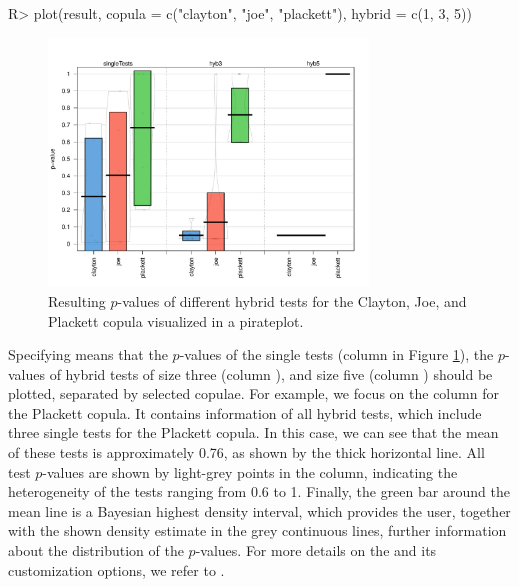 \begin{example}
R> plot(result, copula = c("clayton", "joe", "plackett"), hybrid = c(1, 3, 5))
\end{example}
\vspace{-0.75cm}
\begin{figure}[H]
\centering
\includegraphics[width = 85mm]{img/Functionality_Pirateplot.pdf}
\caption{\mycolor Resulting $p$-values of different hybrid tests for the Clayton, Joe, and Plackett copula visualized in a pirateplot. \bk}
\label{Pirateplot_Example}
\end{figure}

\mycolor Specifying  means that the $p$-values of the single tests (column  in Figure \ref{Pirateplot_Example}), the $p$-values of hybrid tests of size three (column ), and size five (column ) should be plotted, separated by selected copulae. For example, we focus on the column  for the Plackett copula. It contains information of all hybrid tests, which include three single tests for the Plackett copula. In this case, we can see that the mean of these tests is approximately 0.76, as shown by the thick horizontal line. All test $p$-values are shown by light-grey points in the column, indicating the heterogeneity of the tests ranging from 0.6 to 1. Finally, the green bar around the mean line is a Bayesian highest density interval, which provides the user, together with the shown density estimate in the grey continuous lines, further information about the distribution of the $p$-values. For more details on the  and its customization options, we refer to \citet{phillips2017yarrr}.\bk

